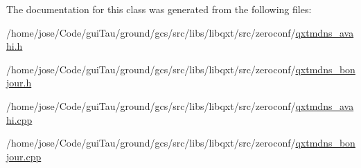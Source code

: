 The documentation for this class was generated from the following files\-:\begin{DoxyCompactItemize}
\item 
/home/jose/\-Code/gui\-Tau/ground/gcs/src/libs/libqxt/src/zeroconf/\hyperlink{qxtmdns__avahi_8h}{qxtmdns\-\_\-avahi.\-h}\item 
/home/jose/\-Code/gui\-Tau/ground/gcs/src/libs/libqxt/src/zeroconf/\hyperlink{qxtmdns__bonjour_8h}{qxtmdns\-\_\-bonjour.\-h}\item 
/home/jose/\-Code/gui\-Tau/ground/gcs/src/libs/libqxt/src/zeroconf/\hyperlink{qxtmdns__avahi_8cpp}{qxtmdns\-\_\-avahi.\-cpp}\item 
/home/jose/\-Code/gui\-Tau/ground/gcs/src/libs/libqxt/src/zeroconf/\hyperlink{qxtmdns__bonjour_8cpp}{qxtmdns\-\_\-bonjour.\-cpp}\end{DoxyCompactItemize}
